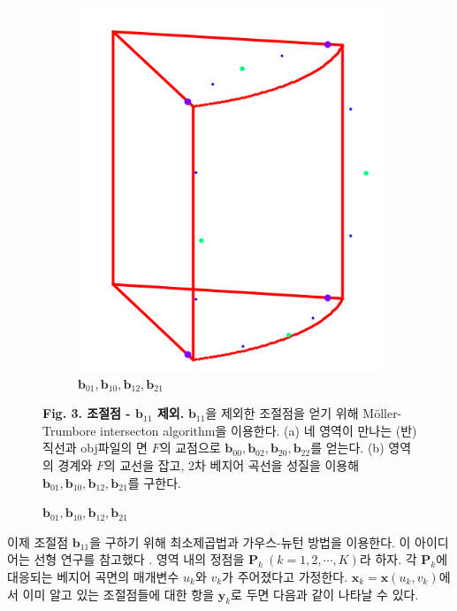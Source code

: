 \documentclass{Humantech_Paper_Awardfullpaper_hutech}
\begin{document}
\begin{figure}[h]
\begin{center}
\begin{subfigure}{.2\textwidth}
			\includegraphics[width=\textwidth]{approx2}
			\caption{$\mathbf{b}_{01}, \mathbf{b}_{10}, \mathbf{b}_{12}, \mathbf{b}_{21}$}
		\end{subfigure}
	\end{center} 
	\raggedright \small \textbf{Fig. 3. 조절점 - $\mathbf{b}_{11}$ 제외.} $\mathbf{b}_{11}$을 제외한 조절점을 얻기 위해 Möller-Trumbore intersecton algorithm을 이용한다. (a) 네 영역이 만나는 (반)직선과 obj파일의 면 $F$의 교점으로 $\mathbf{b}_{00}, \mathbf{b}_{02}, \mathbf{b}_{20}, \mathbf{b}_{22}$를 얻는다. (b) 영역의 경계와 $F$의 교선을 잡고, 2차 베지어 곡선을 성질을 이용해 $\mathbf{b}_{01}, \mathbf{b}_{10}, \mathbf{b}_{12}, \mathbf{b}_{21}$를 구한다. 
\end{figure}

이제 조절점 $\mathbf{b}_{11}$을 구하기 위해 최소제곱법과 가우스-뉴턴 방법을 이용한다. 이 아이디어는 선형 연구를 참고했다 \cite{2021}. 영역 내의 정점을 $\mathbf{P}_k \ (k=1, 2, \cdots, K)$라 하자. 각 $\mathbf{P}_k$에 대응되는 베지어 곡면의 매개변수 $u_k$와 $v_k$가 주어졌다고 가정한다. $\mathbf{x}_k = \mathbf{x}(u_k, v_k)$에서 이미 알고 있는 조절점들에 대한 항을 $\mathbf{y}_k$로 두면 다음과 같이 나타날 수 있다.
\end{document}
